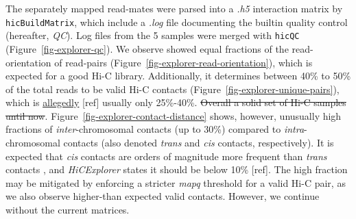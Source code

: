 \documentclass[
  11pt,
  a4paper,
]{scrbook}
\let\oldemph\emph
\renewcommand\emph[1]{\oldemph{\color{gray}#1}}
\begin{document}
The separately mapped read-mates were parsed into a \emph{.h5}
interaction matrix by \texttt{hicBuildMatrix}, which include a
\emph{.log} file documenting the builtin quality control (hereafter,
\emph{QC}). Log files from the 5 samples were merged with \texttt{hicQC}
(Figure~\ref{fig-explorer-qc}). We observe showed equal fractions of the
read-orientation of read-pairs
(Figure~\ref{fig-explorer-read-orientation}), which is expected for a
good Hi-C library. Additionally, it determines between 40\% to 50\% of
the total reads to be valid Hi-C contacts
(Figure~\ref{fig-explorer-unique-pairs}), which is
\href{https://hicexplorer.readthedocs.io/en/latest/content/example_usage.html\#creation-of-a-hi-c-matrix}{allegedly}
{[}ref{]} usually only 25\%-40\%. \st{Overall a solid set of Hi-C
samples until now}. Figure~\ref{fig-explorer-contact-distance} shows,
however, unusually high fractions of \emph{inter}-chromosomal contacts
(up to 30\%) compared to \emph{intra}-chromosomal contacts (also denoted
\emph{trans} and \emph{cis} contacts, respectively). It is expected that
\emph{cis} contacts are orders of magnitude more frequent than
\emph{trans} contacts
\citetext{\citealp[p.~236]{bicciato_hic_2022}; \citealp{lieberman_aiden_comprehensive_2009}},
and \emph{HiCExplorer} states it should be below 10\% {[}ref{]}. The
high fraction may be mitigated by enforcing a stricter \emph{mapq}
threshold for a valid Hi-C pair, as we also observe higher-than expected
valid contacts. However, we continue without the current matrices.
\end{document}
